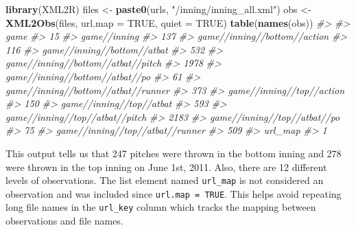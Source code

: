 \documentclass[12pt,]{isuthesis}
\newenvironment{Shaded}{\begin{snugshade}}{\end{snugshade}}
\newcommand{\KeywordTok}[1]{\textcolor[rgb]{0.13,0.29,0.53}{\textbf{{#1}}}}
\newcommand{\DataTypeTok}[1]{\textcolor[rgb]{0.13,0.29,0.53}{{#1}}}
\newcommand{\StringTok}[1]{\textcolor[rgb]{0.31,0.60,0.02}{{#1}}}
\newcommand{\CommentTok}[1]{\textcolor[rgb]{0.56,0.35,0.01}{\textit{{#1}}}}
\newcommand{\OtherTok}[1]{\textcolor[rgb]{0.56,0.35,0.01}{{#1}}}
\newcommand{\NormalTok}[1]{{#1}}
\begin{document}
\begin{Shaded}
\begin{Highlighting}[]
\KeywordTok{library}\NormalTok{(XML2R)}
\NormalTok{files <-}\StringTok{ }\KeywordTok{paste0}\NormalTok{(urls, }\StringTok{"/inning/inning_all.xml"}\NormalTok{)}
\NormalTok{obs <-}\StringTok{ }\KeywordTok{XML2Obs}\NormalTok{(files, }\DataTypeTok{url.map =} \OtherTok{TRUE}\NormalTok{, }\DataTypeTok{quiet =} \OtherTok{TRUE}\NormalTok{) }
\KeywordTok{table}\NormalTok{(}\KeywordTok{names}\NormalTok{(obs))}
\CommentTok{#> }
\CommentTok{#>                                game }
\CommentTok{#>                                  15 }
\CommentTok{#>                        game//inning }
\CommentTok{#>                                 137 }
\CommentTok{#>        game//inning//bottom//action }
\CommentTok{#>                                 116 }
\CommentTok{#>         game//inning//bottom//atbat }
\CommentTok{#>                                 532 }
\CommentTok{#>  game//inning//bottom//atbat//pitch }
\CommentTok{#>                                1978 }
\CommentTok{#>     game//inning//bottom//atbat//po }
\CommentTok{#>                                  61 }
\CommentTok{#> game//inning//bottom//atbat//runner }
\CommentTok{#>                                 373 }
\CommentTok{#>           game//inning//top//action }
\CommentTok{#>                                 150 }
\CommentTok{#>            game//inning//top//atbat }
\CommentTok{#>                                 593 }
\CommentTok{#>     game//inning//top//atbat//pitch }
\CommentTok{#>                                2183 }
\CommentTok{#>        game//inning//top//atbat//po }
\CommentTok{#>                                  75 }
\CommentTok{#>    game//inning//top//atbat//runner }
\CommentTok{#>                                 509 }
\CommentTok{#>                             url_map }
\CommentTok{#>                                   1}
\end{Highlighting}
\end{Shaded}

This output tells us that 247 pitches were thrown in the bottom inning
and 278 were thrown in the top inning on June 1st, 2011. Also, there are
12 different levels of observations. The list element named
\texttt{url\_map} is not considered an observation and was included
since \texttt{url.map = TRUE}. This helps avoid repeating long file
names in the \texttt{url\_key} column which tracks the mapping between
observations and file names.
\end{document}
